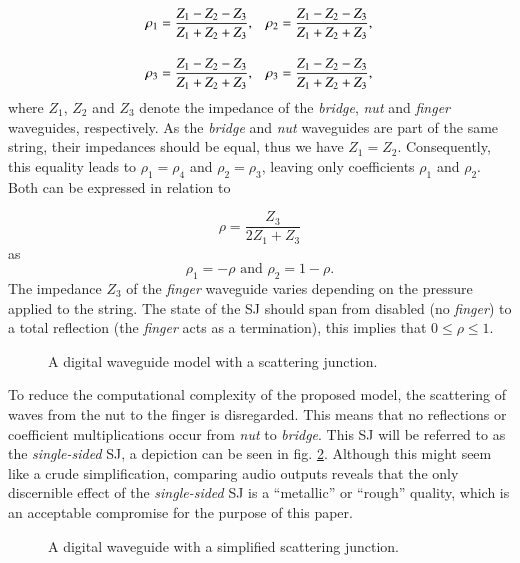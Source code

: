 \documentclass{sigchi}
\begin{document}
\begin{align} \label{eq:rhoCoeff}
	\rho_1& = \frac{Z_1-Z_2-Z_3}{Z_1+Z_2+Z_3},&
	\rho_2& = \frac{Z_1-Z_2-Z_3}{Z_1+Z_2+Z_3},\notag\\[1em]
	\rho_3& = \frac{Z_1-Z_2-Z_3}{Z_1+Z_2+Z_3},&
	\rho_3& = \frac{Z_1-Z_2-Z_3}{Z_1+Z_2+Z_3},
\end{align}
where $Z_1$, $Z_2$ and $Z_3$ denote the impedance of the \textit{bridge}, \textit{nut} and \textit{finger} waveguides, respectively. As the \textit{bridge} and \textit{nut} waveguides are part of the same string, their impedances should be equal, thus we have $Z_1=Z_2$. Consequently, this equality leads to $\rho_1=\rho_4$ and $\rho_2=\rho_3$, leaving only coefficients $\rho_1$ and $\rho_2$. Both can be expressed in relation to

\begin{equation} \label{eq:rho}
	\rho=\frac{Z_3}{2Z_1+Z_3}
\end{equation}
as
\begin{equation}
	\rho_1=-\rho \text{ and } \rho_2=1-\rho.
\end{equation}
The impedance $Z_3$ of the \textit{finger} waveguide varies depending on the pressure applied to the string. The state of the SJ should span from disabled (no \textit{finger}) to a total reflection (the \textit{finger} acts as a termination),  this implies that $0 \leq \rho \leq 1$.

\begin{figure}[h]
	\centering
	\scalebox{0.56}{}
	\caption{A digital waveguide model with a scattering junction.}
	\label{fig:waveguide_sj}
\end{figure}

To reduce the computational complexity of the proposed model, the scattering of waves from the nut to the finger is disregarded. This means that no reflections or coefficient multiplications occur from \textit{nut} to \textit{bridge}. This SJ will be referred to as the \textit{single-sided} SJ, a depiction can be seen in fig. \ref{fig:waveguide_simple_sj}. Although this might seem like a crude simplification, comparing audio outputs reveals that the only discernible effect of the \textit{single-sided} SJ is a ``metallic'' or ``rough'' quality, which is an acceptable compromise for the purpose of this paper.
\begin{figure}[h]
	\centering
	\scalebox{0.6}{}
	\caption{A digital waveguide with a simplified scattering junction.}
	\label{fig:waveguide_simple_sj}
\end{figure}
\end{document}
